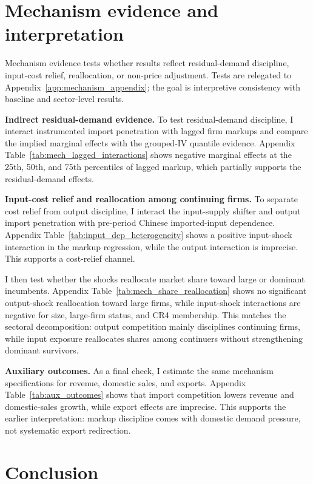 \documentclass[12pt]{article}
\begin{document}
\section{Mechanism evidence and interpretation}
\label{sec:input_extension}

Mechanism evidence tests whether results reflect residual-demand discipline, input-cost relief, reallocation, or non-price adjustment. Tests are relegated to Appendix~\ref{app:mechanism_appendix}; the goal is interpretive consistency with baseline and sector-level results.

\textbf{Indirect residual-demand evidence.} To test residual-demand discipline, I interact instrumented import penetration with lagged firm markups and compare the implied marginal effects with the grouped-IV quantile evidence. Appendix Table~\ref{tab:mech_lagged_interactions} shows negative marginal effects at the 25th, 50th, and 75th percentiles of lagged markup, which partially supports the residual-demand effects.

\textbf{Input-cost relief and reallocation among continuing firms.} To separate cost relief from output discipline, I interact the input-supply shifter and output import penetration with pre-period Chinese imported-input dependence. Appendix Table~\ref{tab:input_dep_heterogeneity} shows a positive input-shock interaction in the markup regression, while the output interaction is imprecise. This supports a cost-relief channel.

I then test whether the shocks reallocate market share toward large or dominant incumbents. Appendix Table~\ref{tab:mech_share_reallocation} shows no significant output-shock reallocation toward large firms, while input-shock interactions are negative for size, large-firm status, and CR4 membership. This matches the sectoral decomposition: output competition mainly disciplines continuing firms, while input exposure reallocates shares among continuers without strengthening dominant survivors.

\textbf{Auxiliary outcomes.} As a final check, I estimate the same mechanism specifications for revenue, domestic sales, and exports. Appendix Table~\ref{tab:aux_outcomes} shows that import competition lowers revenue and domestic-sales growth, while export effects are imprecise. This supports the earlier interpretation: markup discipline comes with domestic demand pressure, not systematic export redirection.

\pagebreak
\section{Conclusion}
\end{document}
